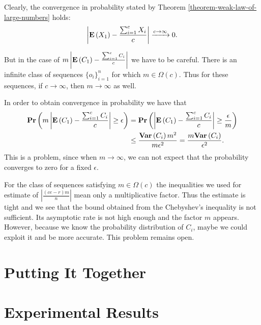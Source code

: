 Clearly, the convergence in probability stated by Theorem \ref{theorem-weak-law-of-large-numbers} holds:
\[
	\left|\mathbf{E}\left(X_1\right) - \frac{\sum\displaylimits_{i = 1}^{c} X_i}{c}\right| \xrightarrow{c \rightarrow \infty} 0 \text{.}
\]

But in the case of $m \left|\mathbf{E}\left(C_1\right) - \frac{\sum\displaylimits_{i = 1}^{c} C_i}{c}\right|$ we have to be careful. There is an infinite class of sequences $\{o_i\}_{i = 1}^{n}$ for which $m \in \Omega(c)$. Thus for these sequences, if $c \rightarrow \infty$, then $m \rightarrow \infty$ as well.

In order to obtain convergence in probability we have that
\[
\begin{split}
\mathbf{Pr}\left(m \left|\mathbf{E}\left(C_1\right) - \frac{\sum\displaylimits_{i = 1}^{c} C_i}{c}\right| \geq \epsilon\right) 
	& = \mathbf{Pr}\left(\left|\mathbf{E}\left(C_1\right) - \frac{\sum\displaylimits_{i = 1}^{c} C_i}{c}\right| \geq \frac{\epsilon}{m}\right)  \\
	& \leq \frac{\mathbf{Var}\left(C_i\right) m ^ 2}{m \epsilon ^ 2} = \frac{m\mathbf{Var}\left(C_i\right)}{\epsilon ^ 2} \text{.}
\end{split}
\]
This is a problem, since when $m \rightarrow \infty$, we can not expect that the probability converges to zero for a fixed $\epsilon$.

For the class of sequences satisfying $m \in \Omega(c)$ the inequalities we used for estimate of $\left|\frac{(ce - r)m}{n}\right|$ mean only a multiplicative factor. Thus the estimate is tight and we see that the bound obtained from the Chebyshev's inequality is not sufficient. Its asymptotic rate is not high enough and the factor $m$ appears. However, because we know the probability distribution of $C_i$, maybe we could exploit it and be more accurate. This problem remains open.

\section{Putting It Together}
\section{Experimental Results}

